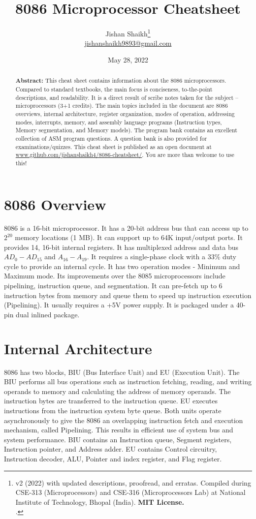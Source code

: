 \documentclass[12pt, a4paper]{scrartcl}
\title{8086 Microprocessor Cheatsheet}
\author{Jishan Shaikh\footnote{v2 (2022) with updated descriptions, proofread, and erratas. Compiled during CSE-313 (Microprocessors) and CSE-316 (Microprocessors Lab) at National Institute of Technology, Bhopal (India). \textbf{MIT License.}\\
		.}\\{\normalsize  \href{mailto:jishanshaikh9893@gmail.com}{jishanshaikh9893@gmail.com}}}
\date{May 28, 2022}
\begin{document}
\maketitle

\begin{abstract}
	\textbf{Abstract:} This cheat sheet contains information about the 8086 microprocessors. Compared to standard textbooks, the main focus is conciseness, to-the-point descriptions, and readability. It is a direct result of scribe notes taken for the subject -- microprocessors (3+1 credits). The main topics included in the document are 8086 overviews, internal architecture, register organization, modes of operation, addressing modes, interrupts, memory, and assembly language programs (Instruction types, Memory segmentation, and Memory models). The program bank contains an excellent collection of ASM program questions. A question bank is also provided for examinations/quizzes. This cheat sheet is published as an open document at \href{https://www.github.com/jishanshaikh4/8086-cheatsheet/}{www.github.com/jishanshaikh4/8086-cheatsheet/}. You are more than welcome to use this! 
\end{abstract}

\section{8086 Overview}
	8086 is a 16-bit microprocessor. It has a 20-bit address bus that can access up to $2^{20}$ memory locations (1 MB). It can support up to 64K input/output ports. It provides 14, 16-bit internal registers. It has multiplexed address and data bus $AD_{0}-AD_{15}$ and $A_{16}-A_{19}$. It requires a single-phase clock with a 33\% duty cycle to provide an internal cycle. It has two operation modes - Minimum and Maximum mode. Its improvements over the 8085 microprocessors include pipelining, instruction queue, and segmentation. It can pre-fetch up to 6 instruction bytes from memory and queue them to speed up instruction execution (Pipelining). It usually requires a +5V power supply. It is packaged under a 40-pin dual inlined package.

\section{Internal Architecture}
	8086 has two blocks, BIU (Bus Interface Unit) and EU (Execution Unit). The BIU performs all bus operations such as instruction fetching, reading, and writing operands to memory and calculating the address of memory operands. The instruction bytes are transferred to the instruction queue. EU executes instructions from the instruction system byte queue. Both units operate asynchronously to give the 8086 an overlapping instruction fetch and execution mechanism, called Pipelining. This results in efficient use of system bus and system performance. BIU contains an Instruction queue, Segment registers, Instruction pointer, and Address adder. EU contains Control circuitry, Instruction decoder, ALU, Pointer and index register, and Flag register. 	\\
	
\end{document}
